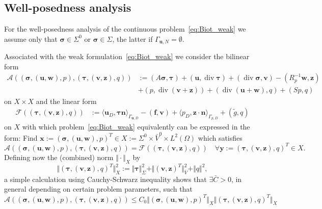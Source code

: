 \documentclass[11pt]{amsart}
\theoremstyle{remark}
\theoremstyle{definition}
\def\sig{{\bm \sigma}}
\def\bu{{\boldsymbol u}}
\def\bv{{\boldsymbol v}}
\def\bw{{\boldsymbol w}}
\def\bff{{\boldsymbol f}}
\renewcommand{\div}{\operatorname{div}}
\renewcommand{\div}{\operatorname{div}}
\def\sig{\boldsymbol \sigma}
\def\bu{\boldsymbol u}
\def\bv{\boldsymbol v}
\def\bw{\boldsymbol w}
\def\bx{\boldsymbol x}
\def\by{\boldsymbol y}
\def\bz{\boldsymbol z}
\def\bn{\boldsymbol n}
\begin{document}
\subsection{Well-posedness analysis}\label{subsec:well_posedness} 

For the well-posedness analysis of the continuous problem~\eqref{eq:Biot_weak} we assume only that 
$\sig \in \Sigma^0$ or $\sig \in \Sigma$, the latter if $\Gamma_{\bu,N} = \emptyset$. 

Associated with the weak formulation~\eqref{eq:Biot_weak} we consider the bilinear form
%
\begin{align}\label{eq:Biot_bilinear_form}  
\mathcal A ((\sig,(\bu,\bw),p),(\bm \tau,(\bv,\bz),q))
&:=(A \sig, \bm \tau) + (\bu,\div \bm \tau) 
+ (\div \bm \sigma,\bm v) - (R_p^{-1}  \bw, \bz) \nonumber \\
& + (p,\div (\bv + \bz)) + (\div (\bu + \bw),q) + (S p,q)
\end{align}
%
on $X {\times} X$ and the linear form
%
\begin{align}\label{eq:Biot_linear_form}  
\mathcal F ((\bm \tau,(\bv,\bz),q))
&:=  \langle \bu_D, 
\bm \tau \bn \rangle_{\Gamma_{\bu,D}}
- (\bff,\bv)
+ \langle p_{D}, \bz \cdot \bn \rangle_{\Gamma_{p,D}}
+ (\tilde{g},q)
\end{align}
on $X$ with which problem~\eqref{eq:Biot_weak} equivalently can be expressed in the form:
Find $\bx := (\sig,(\bu,\bw),p)^T \in X:= \Sigma^0 \times \bar{V}^0 \times L^2(\Omega)$ which satisfies
%
\begin{equation}\label{eq:Biot_weak_abstract}
\mathcal A ((\sig,(\bu,\bw),p),(\bm \tau,(\bv,\bz),q))
=\mathcal F ((\bm \tau,(\bv,\bz),q)) \quad \forall \by := (\bm \tau,(\bv,\bz),q)^T \in X.
\end{equation}
%
Defining now the (combined) norm $\Vert \cdot \Vert_X$ by
\begin{equation}\label{eq:Xnorm}
\Vert (\bm \tau,(\bv,\bz),q)^T \Vert_X^2 := \Vert \bm \tau \Vert_\Sigma^2 + \Vert (\bv,\bz)^T \Vert_{\bar{V}}^2 + \Vert q\Vert^2 ,
\end{equation}
a simple calculation using Cauchy-Schwarz inequality shows that $\exists \bar{C} > 0$, in general depending on certain problem
parameters, such that
%
\begin{equation}\label{eq:boundedness}
\mathcal A ((\sig,(\bu,\bw),p),(\bm \tau,(\bv,\bz),q)) \le  C_0 \Vert (\sig,(\bu,\bw),p)^T \Vert_X \Vert (\bm \tau,(\bv,\bz),q)^T \Vert_X
\end{equation} 
\end{document}
